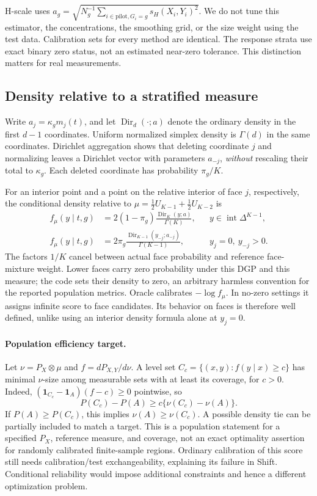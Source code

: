 \documentclass{article}
\newcommand{\D}{\Delta^{K-1}}
\newcommand{\ind}{\mathbf 1}
\begin{document}
H-scale uses $a_g=\sqrt{N_g^{-1}\sum_{i\in\mathrm{pilot},G_i=g}s_H(X_i,Y_i)^2}$. We do not tune this estimator, the concentrations, the smoothing grid, or the size weight using the test data. Calibration sets for every method are identical. The response strata use exact binary zero status, not an estimated near-zero tolerance. This distinction matters for real measurements.

\subsection{Density relative to a stratified measure}
\label{app:oracle}
Write $a_j=\kappa_g m_j(t)$, and let $\operatorname{Dir}_d(\cdot;a)$ denote the ordinary density in the first $d-1$ coordinates. Uniform normalized simplex density is $\Gamma(d)$ in the same coordinates. Dirichlet aggregation shows that deleting coordinate $j$ and normalizing leaves a Dirichlet vector with parameters $a_{-j}$, \emph{without} rescaling their total to $\kappa_g$. Each deleted coordinate has probability $\pi_g/K$.

For an interior point and a point on the relative interior of face $j$, respectively, the conditional density relative to $\mu=\tfrac12U_{K-1}+\tfrac12U_{K-2}$ is
\begin{align}
 f_\mu(y\mid t,g)&=2(1-\pi_g)\frac{\operatorname{Dir}_K(y;a)}{\Gamma(K)},
 &&y\in\operatorname{int}\D,\\
 f_\mu(y\mid t,g)&=2\pi_g\frac{\operatorname{Dir}_{K-1}(y_{-j};a_{-j})}{\Gamma(K-1)},
 &&y_j=0,\ y_{-j}>0.
\end{align}
The factors $1/K$ cancel between actual face probability and reference face-mixture weight. Lower faces carry zero probability under this DGP and this measure; the code sets their density to zero, an arbitrary harmless convention for the reported population metrics. Oracle calibrates $-\log f_\mu$. In no-zero settings it assigns infinite score to face candidates. Its behavior on faces is therefore well defined, unlike using an interior density formula alone at $y_j=0$.

\paragraph{Population efficiency target.}
Let $\nu=P_X\otimes\mu$ and $f=dP_{X,Y}/d\nu$. A level set $C_c=\{(x,y):f(y\mid x)\ge c\}$ has minimal $\nu$-size among measurable sets with at least its coverage, for $c>0$. Indeed, $(\ind_{C_c}-\ind_A)(f-c)\ge0$ pointwise, so
\begin{equation}
 P(C_c)-P(A)\ge c\{\nu(C_c)-\nu(A)\}.
\end{equation}
If $P(A)\ge P(C_c)$, this implies $\nu(A)\ge\nu(C_c)$. A possible density tie can be partially included to match a target. This is a population statement for a specified $P_X$, reference measure, and coverage, not an exact optimality assertion for randomly calibrated finite-sample regions. Ordinary calibration of this score still needs calibration/test exchangeability, explaining its failure in Shift. Conditional reliability would impose additional constraints and hence a different optimization problem.
\end{document}
